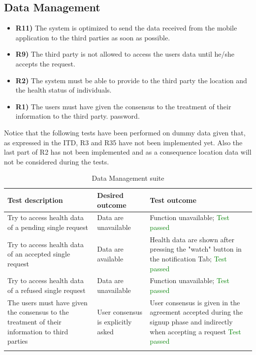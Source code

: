 \documentclass[titlepage]{article}
\begin{document}
\subsection{Data Management}
\begin{itemize}
    \item {\bf R11)} The system is optimized to send the data received from the mobile application to the third parties as soon as possible.
    \item {\bf R9)} The third party is not allowed to access the users data until he/she accepts the request.
    \item {\bf R2)} The system must be able to provide to the third party the location and the health status of individuals.
    \item {\bf R1)} The users must have given the consensus to the treatment of their information to the third party.
 password.
\end{itemize}

\noindent
Notice that the following tests have been performed on dummy data given that, as expressed in the ITD, R3 and R35 have not been implemented yet. Also the last part of R2 has not been implemented and as a consequence location data will not be considered during the tests.

\begin{longtable}{| p{3 cm} | p{4 cm} | p{4 cm} |} \hline
    {\bf Test description} & {\bf Desired outcome} & {\bf Test outcome} \\ \hline
    Try to access health data of a pending single request & Data are unavailable &
    Function unavailable; \textcolor{green}{Test passed}\\ \hline
    Try to access health data of an accepted single request & 
    Data are available
        & Health data are shown after pressing the "watch" button in the notification Tab;  \textcolor{green}{Test  passed}\\ \hline
    Try to access health data of a refused single request & 
    Data are unavailable
        & Function unavailable; \textcolor{green}{Test passed} \\ \hline
    The users must have given the consensus to the treatment of their information to third parties  & 
    User consensus is explicitly asked
        & User consensus is given in the agreement accepted during the signup phase and indirectly when accepting a request  \textcolor{green}{Test passed}\\ \hline
    \caption{Data Management suite}
\end{longtable}
\end{document}
